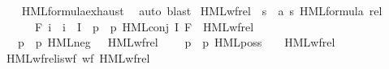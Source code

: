 \begin{isabellebody}
%
\isadelimproof
\ \ %
\endisadelimproof
%
\isatagproof
{}\isamarkupfalse%
\ HML{\isacharunderscore}{\kern0pt}formula{\isachardot}{\kern0pt}exhaust\ \isamarkupfalse%
\ {\isacharparenleft}{\kern0pt}auto{\isacharcomma}{\kern0pt}\ blast{\isacharparenright}{\kern0pt}%
\endisatagproof
{\isafoldproof}%
%
\isadelimproof
\isanewline
%
\endisadelimproof
\isanewline
{}\isamarkupfalse%
\ HML{\isacharunderscore}{\kern0pt}wf{\isacharunderscore}{\kern0pt}rel\ {\isacharcolon}{\kern0pt}{\isacharcolon}{\kern0pt}\ {\isacartoucheopen}{\isacharparenleft}{\kern0pt}{\isacharprime}{\kern0pt}s\ {\isasymtimes}\ {\isacharparenleft}{\kern0pt}{\isacharprime}{\kern0pt}a{\isacharcomma}{\kern0pt}\ {\isacharprime}{\kern0pt}s{\isacharparenright}{\kern0pt}\ HML{\isacharunderscore}{\kern0pt}formula{\isacharparenright}{\kern0pt}\ rel{\isacartoucheclose}\ \isanewline
\ \ \isanewline
\ \ \ \ {\isacartoucheopen}{\isasymphi}\ {\isacharequal}{\kern0pt}\ F\ i\ {\isasymand}\ i\ {\isasymin}\ I\ {\isasymLongrightarrow}\ {\isacharparenleft}{\kern0pt}{\isacharparenleft}{\kern0pt}p{\isacharcomma}{\kern0pt}\ {\isasymphi}{\isacharparenright}{\kern0pt}{\isacharcomma}{\kern0pt}\ {\isacharparenleft}{\kern0pt}p{\isacharcomma}{\kern0pt}\ HML{\isacharunderscore}{\kern0pt}conj\ I\ F{\isacharparenright}{\kern0pt}{\isacharparenright}{\kern0pt}\ {\isasymin}\ HML{\isacharunderscore}{\kern0pt}wf{\isacharunderscore}{\kern0pt}rel{\isacartoucheclose}\ \isanewline
\ \ {\isacharbar}{\kern0pt}\ {\isacartoucheopen}{\isacharparenleft}{\kern0pt}{\isacharparenleft}{\kern0pt}p{\isacharcomma}{\kern0pt}\ {\isasymphi}{\isacharparenright}{\kern0pt}{\isacharcomma}{\kern0pt}\ {\isacharparenleft}{\kern0pt}p{\isacharcomma}{\kern0pt}\ HML{\isacharunderscore}{\kern0pt}neg\ {\isasymphi}{\isacharparenright}{\kern0pt}{\isacharparenright}{\kern0pt}\ {\isasymin}\ HML{\isacharunderscore}{\kern0pt}wf{\isacharunderscore}{\kern0pt}rel{\isacartoucheclose}\ \isanewline
\ \ {\isacharbar}{\kern0pt}\ {\isacartoucheopen}{\isacharparenleft}{\kern0pt}{\isacharparenleft}{\kern0pt}p{\isacharcomma}{\kern0pt}\ {\isasymphi}{\isacharparenright}{\kern0pt}{\isacharcomma}{\kern0pt}\ {\isacharparenleft}{\kern0pt}p{\isacharprime}{\kern0pt}{\isacharcomma}{\kern0pt}\ HML{\isacharunderscore}{\kern0pt}poss\ {\isasymalpha}\ {\isasymphi}{\isacharparenright}{\kern0pt}{\isacharparenright}{\kern0pt}\ {\isasymin}\ HML{\isacharunderscore}{\kern0pt}wf{\isacharunderscore}{\kern0pt}rel{\isacartoucheclose}\isanewline
\isanewline
{}\isamarkupfalse%
\ HML{\isacharunderscore}{\kern0pt}wf{\isacharunderscore}{\kern0pt}rel{\isacharunderscore}{\kern0pt}is{\isacharunderscore}{\kern0pt}wf{\isacharcolon}{\kern0pt}\ {\isacartoucheopen}wf\ HML{\isacharunderscore}{\kern0pt}wf{\isacharunderscore}{\kern0pt}rel{\isacartoucheclose}\ \isanewline

\end{isabellebody}

